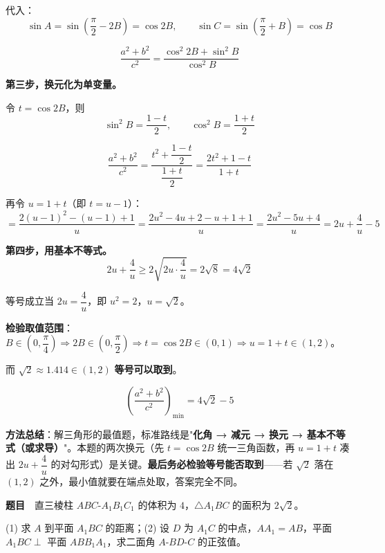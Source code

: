 代入：
\[\sin A=\sin\left(\frac\pi2-2B\right)=\cos2B,\qquad \sin C=\sin\left(\frac\pi2+B\right)=\cos B\]

\[\frac{a^{2}+b^{2}}{c^{2}}=\frac{\cos^{2}2B+\sin^{2}B}{\cos^{2}B}\]

\textbf{第三步，换元化为单变量。}

令 $t=\cos2B$，则
\[\sin^{2}B=\frac{1-t}2,\qquad \cos^{2}B=\frac{1+t}2\]

\[\frac{a^{2}+b^{2}}{c^{2}}=\frac{t^{2}+\dfrac{1-t}2}{\dfrac{1+t}2}=\frac{2t^{2}+1-t}{1+t}\]

再令 $u=1+t$（即 $t=u-1$）：
\[=\frac{2(u-1)^{2}-(u-1)+1}{u}=\frac{2u^{2}-4u+2-u+1+1}{u}=\frac{2u^{2}-5u+4}{u}=2u+\frac4u-5\]

\textbf{第四步，用基本不等式。}
\[2u+\frac4u\ge2\sqrt{2u\cdot\frac4u}=2\sqrt8=4\sqrt2\]

等号成立当 $2u=\dfrac4u$，即 $u^{2}=2$，$u=\sqrt2$。

\textbf{检验取值范围}：$B\in\left(0,\dfrac\pi4\right)\Rightarrow2B\in\left(0,\dfrac\pi2\right)\Rightarrow t=\cos2B\in(0,1)\Rightarrow u=1+t\in(1,2)$。

而 $\sqrt2\approx1.414\in(1,2)$  \textbf{等号可以取到}。

\[\left(\frac{a^{2}+b^{2}}{c^{2}}\right)_{\min}=4\sqrt2-5\]


\begin{gktip}
\textbf{方法总结}：解三角形的最值题，标准路线是"\textbf{化角 → 减元 → 换元 → 基本不等式（或求导）}"。本题的两次换元（先 $t=\cos2B$ 统一三角函数，再 $u=1+t$ 凑出 $2u+\dfrac4u$ 的对勾形式）是关键。\textbf{最后务必检验等号能否取到}——若 $\sqrt2$ 落在 $(1,2)$ 之外，最小值就要在端点处取，答案完全不同。
\end{gktip}

\par\medskip


\textbf{题目}　直三棱柱 $ABC\text{-}A_1B_1C_1$ 的体积为 $4$，$\triangle A_1BC$ 的面积为 $2\sqrt2$。

\begin{center}\end{center}

  (1) 求 $A$ 到平面 $A_1BC$ 的距离；(2) 设 $D$ 为 $A_1C$ 的中点，$AA_1=AB$，平面 $A_1BC\perp$ 平面 $ABB_1A_1$，求二面角 $A\text{-}BD\text{-}C$ 的正弦值。

\par\medskip

